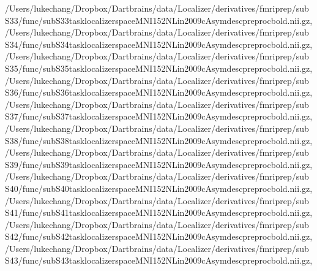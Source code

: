 \documentclass[letterpaper,10pt,english]{sphinxmanual}
\begin{document}
\begin{sphinxVerbatim}[commandchars=\\\{\}]
 \PYGZsq{}/Users/lukechang/Dropbox/Dartbrains/data/Localizer/derivatives/fmriprep/sub\PYGZhy{}S33/func/sub\PYGZhy{}S33\PYGZus{}task\PYGZhy{}localizer\PYGZus{}space\PYGZhy{}MNI152NLin2009cAsym\PYGZus{}desc\PYGZhy{}preproc\PYGZus{}bold.nii.gz\PYGZsq{},
 \PYGZsq{}/Users/lukechang/Dropbox/Dartbrains/data/Localizer/derivatives/fmriprep/sub\PYGZhy{}S34/func/sub\PYGZhy{}S34\PYGZus{}task\PYGZhy{}localizer\PYGZus{}space\PYGZhy{}MNI152NLin2009cAsym\PYGZus{}desc\PYGZhy{}preproc\PYGZus{}bold.nii.gz\PYGZsq{},
 \PYGZsq{}/Users/lukechang/Dropbox/Dartbrains/data/Localizer/derivatives/fmriprep/sub\PYGZhy{}S35/func/sub\PYGZhy{}S35\PYGZus{}task\PYGZhy{}localizer\PYGZus{}space\PYGZhy{}MNI152NLin2009cAsym\PYGZus{}desc\PYGZhy{}preproc\PYGZus{}bold.nii.gz\PYGZsq{},
 \PYGZsq{}/Users/lukechang/Dropbox/Dartbrains/data/Localizer/derivatives/fmriprep/sub\PYGZhy{}S36/func/sub\PYGZhy{}S36\PYGZus{}task\PYGZhy{}localizer\PYGZus{}space\PYGZhy{}MNI152NLin2009cAsym\PYGZus{}desc\PYGZhy{}preproc\PYGZus{}bold.nii.gz\PYGZsq{},
 \PYGZsq{}/Users/lukechang/Dropbox/Dartbrains/data/Localizer/derivatives/fmriprep/sub\PYGZhy{}S37/func/sub\PYGZhy{}S37\PYGZus{}task\PYGZhy{}localizer\PYGZus{}space\PYGZhy{}MNI152NLin2009cAsym\PYGZus{}desc\PYGZhy{}preproc\PYGZus{}bold.nii.gz\PYGZsq{},
 \PYGZsq{}/Users/lukechang/Dropbox/Dartbrains/data/Localizer/derivatives/fmriprep/sub\PYGZhy{}S38/func/sub\PYGZhy{}S38\PYGZus{}task\PYGZhy{}localizer\PYGZus{}space\PYGZhy{}MNI152NLin2009cAsym\PYGZus{}desc\PYGZhy{}preproc\PYGZus{}bold.nii.gz\PYGZsq{},
 \PYGZsq{}/Users/lukechang/Dropbox/Dartbrains/data/Localizer/derivatives/fmriprep/sub\PYGZhy{}S39/func/sub\PYGZhy{}S39\PYGZus{}task\PYGZhy{}localizer\PYGZus{}space\PYGZhy{}MNI152NLin2009cAsym\PYGZus{}desc\PYGZhy{}preproc\PYGZus{}bold.nii.gz\PYGZsq{},
 \PYGZsq{}/Users/lukechang/Dropbox/Dartbrains/data/Localizer/derivatives/fmriprep/sub\PYGZhy{}S40/func/sub\PYGZhy{}S40\PYGZus{}task\PYGZhy{}localizer\PYGZus{}space\PYGZhy{}MNI152NLin2009cAsym\PYGZus{}desc\PYGZhy{}preproc\PYGZus{}bold.nii.gz\PYGZsq{},
 \PYGZsq{}/Users/lukechang/Dropbox/Dartbrains/data/Localizer/derivatives/fmriprep/sub\PYGZhy{}S41/func/sub\PYGZhy{}S41\PYGZus{}task\PYGZhy{}localizer\PYGZus{}space\PYGZhy{}MNI152NLin2009cAsym\PYGZus{}desc\PYGZhy{}preproc\PYGZus{}bold.nii.gz\PYGZsq{},
 \PYGZsq{}/Users/lukechang/Dropbox/Dartbrains/data/Localizer/derivatives/fmriprep/sub\PYGZhy{}S42/func/sub\PYGZhy{}S42\PYGZus{}task\PYGZhy{}localizer\PYGZus{}space\PYGZhy{}MNI152NLin2009cAsym\PYGZus{}desc\PYGZhy{}preproc\PYGZus{}bold.nii.gz\PYGZsq{},
 \PYGZsq{}/Users/lukechang/Dropbox/Dartbrains/data/Localizer/derivatives/fmriprep/sub\PYGZhy{}S43/func/sub\PYGZhy{}S43\PYGZus{}task\PYGZhy{}localizer\PYGZus{}space\PYGZhy{}MNI152NLin2009cAsym\PYGZus{}desc\PYGZhy{}preproc\PYGZus{}bold.nii.gz\PYGZsq{},

\end{sphinxVerbatim}
\end{document}
